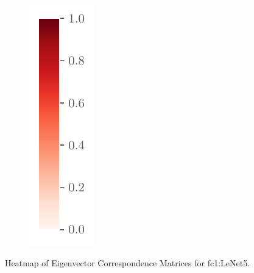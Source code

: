 \begin{figure}[H]
\begin{subfigure}[t]{0.065\textwidth}
        \includegraphics[width=\textwidth]{Figures/Misc/colorbar.pdf}
    \end{subfigure}
    \captionsetup{justification=centering}
    \caption{Heatmap of Eigenvector Correspondence Matrices for fc1:LeNet5.}
    \label{fig:Corr_fc}
\end{figure}

